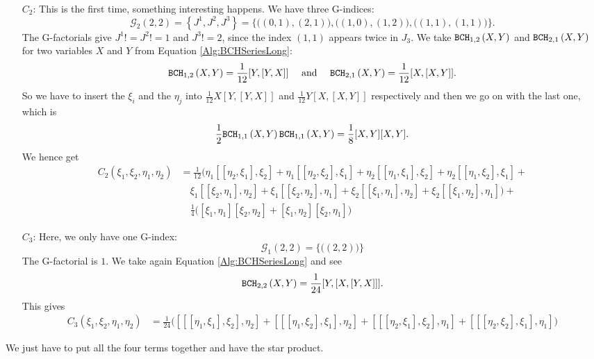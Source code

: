 \begin{itemize}
	\item[$C_2$:]
	This is the first time, something interesting happens. We have three 
	G-indices:
	\begin{equation*}
		\mathcal{G}_2(2,2) 
		=
		\left\{ J^1, J^2, J^3 \right\}
		= 
		\big\{ 
			\big((0,1), (2,1)\big), 
			\big((1,0), (1,2)\big), 
			\big((1,1), (1,1)\big) 
		\big\}.
	\end{equation*}
	The G-factorials give $J^1! = J^2! = 1$ and $J^3! = 2$, since the index 
	$(1,1)$ appears twice in $J_3$. We take $\mathtt{BCH}_{1, 2}\left(X, Y\right)$ and 
	$\mathtt{BCH}_{2, 1}\left(X, Y\right)$ for two variables $X$ and $Y$ from Equation 
	\eqref{Alg:BCHSeriesLong}:
	\begin{equation*}
		\mathtt{BCH}_{1, 2}\left(X, Y\right)
		=
		\frac{1}{12}[Y, [Y, X]]
		\quad \text{ and } \quad
		\mathtt{BCH}_{2, 1}\left(X, Y\right)
		=
		\frac{1}{12}[X, [X, Y]].
	\end{equation*}
	So we have to insert the $\xi_i$ and the $\eta_j$ into $\frac{1}{12} 
	X [Y, [Y, X]]$ and $\frac{1}{12} Y [X, [X, Y]]$ respectively and then 
	we go on with the last one, which is
	\begin{equation*}
		\frac{1}{2}
		\mathtt{BCH}_{1, 1}\left(X, Y\right)
		\mathtt{BCH}_{1, 1}\left(X, Y\right)
		=
		\frac{1}{8}
		[X, Y][X, Y].
	\end{equation*}
	We hence get
	\begin{align*}
		C_2(\xi_1, \xi_2, \eta_1, \eta_2) 
		& = 
		\frac{1}{12}
		\big( 
			\eta_1 [[\eta_2, \xi_1],\xi_2] + 
			\eta_1 [[\eta_2, \xi_2],\xi_1] + 
			\eta_2 [[\eta_1, \xi_1],\xi_2] + 
			\eta_2 [[\eta_1, \xi_2],\xi_1] +
		\\
		& \quad
			\xi_1 [[\xi_2, \eta_1],\eta_2] + 
			\xi_1 [[\xi_2, \eta_2],\eta_1] + 
			\xi_2 [[\xi_1, \eta_1],\eta_2] + 
			\xi_2 [[\xi_1, \eta_2],\eta_1] 
 		\big) +
 		\\
 		& \quad
		\frac{1}{4} 
		\big( 
			[\xi_1,\eta_1][\xi_2,\eta_2] + 
			[\xi_1,\eta_2][\xi_2,\eta_1] 
		\big)
	\end{align*}
	
	\item[$C_3$:]
	Here, we only have one G-index:
	\begin{equation*}
		\mathcal{G}_1(2,2) 
		=
		\big\{ 
			\big( (2,2) \big) 
		\big\}
	\end{equation*}
	The G-factorial is $1$. We take again Equation \eqref{Alg:BCHSeriesLong} 
	and see
	\begin{equation*}
		\mathtt{BCH}_{2, 2}\left(X, Y\right)
		=
		\frac{1}{24}
		[Y, [X, [Y, X]]].
	\end{equation*}
	This gives
	\begin{align*}
		C_3(\xi_1, \xi_2, \eta_1, \eta_2) 
		& = 
		\frac{1}{24}
		\big( 
			[[[\eta_1,\xi_1],\xi_2],\eta_2] + 
			[[[\eta_1,\xi_2],\xi_1],\eta_2] +
			[[[\eta_2,\xi_1],\xi_2],\eta_1] + 
			[[[\eta_2,\xi_2],\xi_1],\eta_1] 
		\big)
	\end{align*}
\end{itemize}
We just have to put all the four terms together and have the star product.


